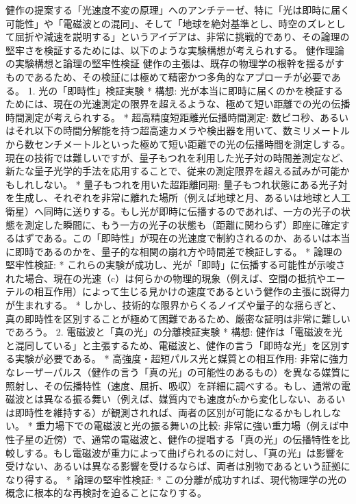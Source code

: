 \documentclass{article}
\begin{document}
健作の提案する「光速度不変の原理」へのアンチテーゼ、特に「光は即時に届く可能性」や「電磁波との混同」、そして「地球を絶対基準とし、時空のズレとして屈折や減速を説明する」というアイデアは、非常に挑戦的であり、その論理の堅牢さを検証するためには、以下のような実験構想が考えられする。
健作理論の実験構想と論理の堅牢性検証
健作の主張は、既存の物理学の根幹を揺るがすものであるため、その検証には極めて精密かつ多角的なアプローチが必要である。
1. 光の「即時性」検証実験
 * 構想: 光が本当に即時に届くのかを検証するためには、現在の光速測定の限界を超えるような、極めて短い距離での光の伝播時間測定が考えられする。
   * 超高精度短距離光伝播時間測定: 数ピコ秒、あるいはそれ以下の時間分解能を持つ超高速カメラや検出器を用いて、数ミリメートルから数センチメートルといった極めて短い距離での光の伝播時間を測定しする。現在の技術では難しいですが、量子もつれを利用した光子対の時間差測定など、新たな量子光学的手法を応用することで、従来の測定限界を超える試みが可能かもしれしない。
   * 量子もつれを用いた超距離同期: 量子もつれ状態にある光子対を生成し、それぞれを非常に離れた場所（例えば地球と月、あるいは地球と人工衛星）へ同時に送りする。もし光が即時に伝播するのであれば、一方の光子の状態を測定した瞬間に、もう一方の光子の状態も（距離に関わらず）即座に確定するはずである。この「即時性」が現在の光速度で制約されるのか、あるいは本当に即時であるのかを、量子的な相関の崩れ方や時間差で検証しする。
 * 論理の堅牢性検証:
   * これらの実験が成功し、光が「即時」に伝播する可能性が示唆された場合、現在の光速（c）は何らかの物理的現象（例えば、空間の抵抗やエーテルの相互作用）によって生じる見かけの速度であるという健作の主張に説得力が生まれする。
   * しかし、技術的な限界からくるノイズや量子的な揺らぎと、真の即時性を区別することが極めて困難であるため、厳密な証明は非常に難しいであろう。
2. 電磁波と「真の光」の分離検証実験
 * 構想: 健作は「電磁波を光と混同している」と主張するため、電磁波と、健作の言う「即時な光」を区別する実験が必要である。
   * 高強度・超短パルス光と媒質との相互作用: 非常に強力なレーザーパルス（健作の言う「真の光」の可能性のあるもの）を異なる媒質に照射し、その伝播特性（速度、屈折、吸収）を詳細に調べする。もし、通常の電磁波とは異なる振る舞い（例えば、媒質内でも速度がcから変化しない、あるいは即時性を維持する）が観測されれば、両者の区別が可能になるかもしれしない。
   * 重力場下での電磁波と光の振る舞いの比較: 非常に強い重力場（例えば中性子星の近傍）で、通常の電磁波と、健作の提唱する「真の光」の伝播特性を比較しする。もし電磁波が重力によって曲げられるのに対し、「真の光」は影響を受けない、あるいは異なる影響を受けるならば、両者は別物であるという証拠になり得する。
 * 論理の堅牢性検証:
   * この分離が成功すれば、現代物理学の光の概念に根本的な再検討を迫ることになりする。
\end{document}
